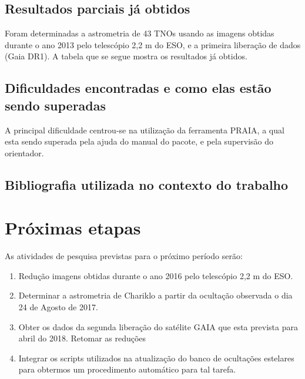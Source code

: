 \documentclass[a4paper, 11pt]{article}
\begin{document}
\subsection{Resultados parciais já obtidos}
Foram determinadas a astrometria de 43 TNOs usando as imagens obtidas durante o ano 2013 pelo telescópio 2,2 m do ESO, e a primeira liberação de dados (Gaia DR1). A tabela que se segue mostra os resultados já obtidos.  
\subsection{Dificuldades encontradas e como elas estão sendo superadas}
A principal dificuldade centrou-se na utilização da ferramenta PRAIA, a qual esta sendo superada pela ajuda do manual do pacote, e pela supervisão do orientador.  

\subsection{Bibliografia utilizada no contexto do trabalho}

\section{Pr\'oximas etapas}

As atividades de pesquisa previstas para o pr\'oximo per\'iodo ser\~ao:

\begin{enumerate}
\item Redução imagens obtidas durante o ano 2016 pelo telescópio 2,2 m do ESO.
\item Determinar a astrometria de Chariklo a partir da ocultação observada o dia 24 de Agosto de 2017. 
\item Obter os dados da segunda liberação do satélite GAIA que esta prevista para abril do 2018. Retomar as redu\c c\~oes
\item Integrar os scripts utilizados na atualiza\c c\~ao do banco de oculta\c c\~oes estelares para obtermos um procedimento autom\'atico para tal tarefa.
\end{enumerate}
\end{document}

